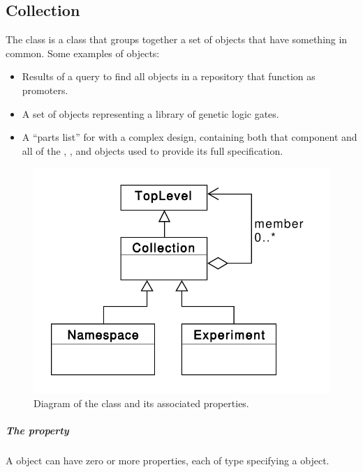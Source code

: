\subsection {Collection}
\label{sec:Collection}
The  class is a class that groups together a set of  objects that have something in common.
Some examples of  objects:
\begin{itemize}
\item Results of a query to find all  objects in a repository that function as promoters.
\item A set of  objects representing a library of genetic logic gates.
\item A ``parts list'' for  with a complex design, containing both that component and all of the , , and  objects used to provide its full specification.
\end{itemize}

\begin{figure}[ht]
\begin{center}
\includegraphics[scale=0.6]{uml/collection}
\caption[]{Diagram of the  class and its associated properties.}
\label{uml:collection}
\end{center}
\end{figure}

\subparagraph{The  property}\label{sec:member}
A  object can have zero or more  properties, each of type  specifying a  object.

